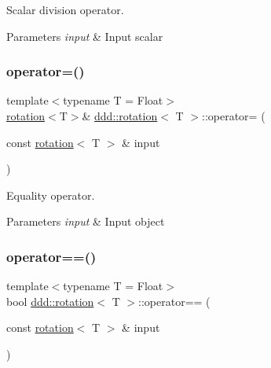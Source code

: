 Scalar division operator. 


\begin{DoxyParams}{Parameters}
{\em input} & Input scalar \\
\hline
\end{DoxyParams}
\mbox{\label{classddd_1_1rotation_a7ea14405fb6eba57a9cf3de1bc200fd0}} 
\subsubsection{\texorpdfstring{operator=()}{operator=()}}
{\footnotesize\ttfamily template$<$typename T  = Float$>$ \\
\hyperlink{classddd_1_1rotation}{rotation}$<$T$>$\& \hyperlink{classddd_1_1rotation}{ddd\+::rotation}$<$ T $>$\+::operator= (\begin{DoxyParamCaption}\item[{const \hyperlink{classddd_1_1rotation}{rotation}$<$ T $>$ \&}]{input }\end{DoxyParamCaption})\hspace{0.3cm}{\ttfamily [inline]}}



Equality operator. 


\begin{DoxyParams}{Parameters}
{\em input} & Input object \\
\hline
\end{DoxyParams}
\mbox{\label{classddd_1_1rotation_ae704ea435ead1c66b7ca0bd4899ce2bc}} 
\subsubsection{\texorpdfstring{operator==()}{operator==()}}
{\footnotesize\ttfamily template$<$typename T  = Float$>$ \\
bool \hyperlink{classddd_1_1rotation}{ddd\+::rotation}$<$ T $>$\+::operator== (\begin{DoxyParamCaption}\item[{const \hyperlink{classddd_1_1rotation}{rotation}$<$ T $>$ \&}]{input }\end{DoxyParamCaption})\hspace{0.3cm}{\ttfamily [inline]}}



